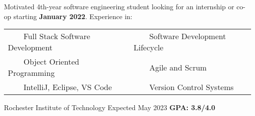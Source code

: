 \documentclass{awesome-cv}
\newcommand{\tabitem}{~~\llap{\textbullet}~~}
\begin{document}
	\makecvheader[C]

	\makecvfooter
		{}
		{}
		{}

		\vspace{-0.1cm}
		
		Motivated 4th-year software engineering student looking for an internship or co-op starting \textbf{January 2022}. Experience in:
		
		\begin{center}
		\begin{tabular}{l@{\hskip 2cm}l}
		\tabitem Full Stack Software Development & \tabitem Software Development Lifecycle \\
		\tabitem Object Oriented Programming & \tabitem Agile and Scrum \\
		\tabitem IntelliJ, Eclipse, VS Code & \tabitem Version Control Systems
		\end{tabular}





		\end{center}
		\vspace{-0.25cm}
	
		\vspace{-0.15cm}
		\begin{cventries}
			\cventryB
				{}
				{Rochester Institute of Technology\small{\textnormal{\color{graytext}{\enskip B.S. Software Engineering}}}}
				{Expected May 2023}
				{}
                		{\textbf{GPA: 3.8/4.0}}
		\end{cventries}
		
\end{document}
